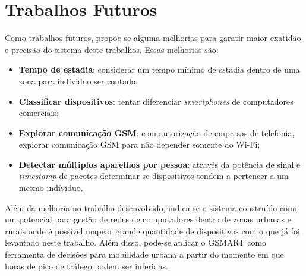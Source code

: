 \section{Trabalhos Futuros}
Como trabalhos futuros, propõe-se alguma melhorias para garatir maior exatidão e
precisão do sistema deste trabalhos. Essas melhorias são:
\begin{itemize}
    \item \textbf{Tempo de estadia}: considerar um tempo mínimo de estadia dentro de uma zona para indíviduo ser
    contado;
    \item \textbf{Classificar dispositivos}: tentar diferenciar \emph{smartphones} de computadores comerciais;
    \item \textbf{Explorar comunicação GSM}: com autorização de empresas de telefonia, explorar comunicação GSM
    para não depender somente do Wi-Fi;
    \item \textbf{Detectar múltiplos aparelhos por pessoa}: através da potência de sinal e \emph{timestamp}
    de pacotes determinar se dispositivos tendem a pertencer a um mesmo indíviduo.
\end{itemize}

Além da melhoria no trabalho desenvolvido, indica-se o sistema construído como um potencial para gestão de redes
de computadores dentro de zonas urbanas e rurais onde é possível mapear grande quantidade de dispositivos com o
que já foi levantado neste trabalho. Além disso, pode-se aplicar o GSMART como ferramenta de decisões para mobilidade
urbana a partir do momento em que horas de pico de tráfego podem ser inferidas.
